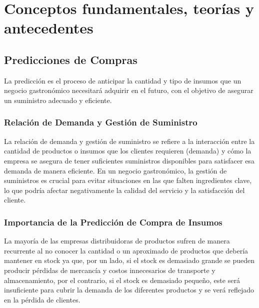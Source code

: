 \fancyhead{}
\fancyfoot{}
\newtheorem{teorema}{Teorema}
\cfoot{\thepage}


\chapter{Conceptos fundamentales, teorías y antecedentes}

\section{Predicciones de Compras}

La predicción es el proceso de anticipar la cantidad y tipo de insumos que un
negocio gastronómico necesitará adquirir en el futuro, con el objetivo de
asegurar un suministro adecuado y eficiente.

\subsection{Relación de Demanda y Gestión de Suministro}

La relación de demanda y gestión de suministro se refiere a la interacción
entre la cantidad de productos o insumos que los clientes requieren (demanda) y
cómo la empresa se asegura de tener suficientes suministros disponibles para
satisfacer esa demanda de manera eficiente. En un negocio gastronómico, la
gestión de suministros es crucial para evitar situaciones en las que falten
ingredientes clave, lo que podría afectar negativamente la calidad del servicio
y la satisfacción del cliente.

\subsection{Importancia de la Predicción de Compra de Insumos}

La mayoría de las empresas distribuidoras de productos sufren de manera
recurrente al no conocer la cantidad o un aproximado de productos que debería
mantener en stock ya que, por un lado, si el stock es demasiado grande se
pueden producir pérdidas de mercancía y costos innecesarios de transporte y
almacenamiento, por el contrario, si el stock es demasiado pequeño, este será
insuficiente para cubrir la demanda de los diferentes productos y se verá
reflejado en la pérdida de clientes\cite{romero2021prediccion}.

